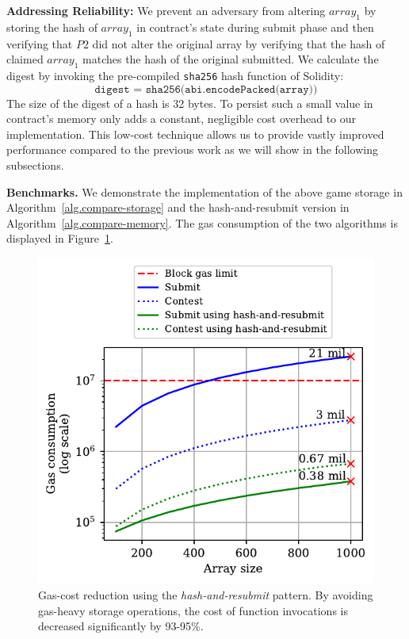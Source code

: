 \noindent

\textbf{Addressing Reliability:} We prevent an adversary from altering
$array_1$ by storing the hash of $array_1$ in contract's state during submit
phase and then verifying that $P2$ did not alter the original array by
verifying that the hash of claimed $array_1$ matches the hash of the original
submitted. We calculate the digest by invoking the pre-compiled \texttt{sha256}
hash function of Solidity:
\[\texttt{digest = sha256(abi.encodePacked(array))}\] The size of the digest of
a hash is 32 bytes. To persist such a small value in contract's memory only
adds a constant, negligible cost overhead to our implementation. This low-cost
technique allows us to provide vastly improved performance compared to the
previous work as we will show in the following subsections.

\noindent
\textbf{Benchmarks.} We demonstrate the implementation of the above game storage in
Algorithm~\ref{alg.compare-storage} and the hash-and-resubmit version in
Algorithm~\ref{alg.compare-memory}. The gas consumption of the two algorithms
is displayed in Figure~\ref{fig:har-example}.

\begin{figure}[h!]
\begin{center}
\includegraphics[width=1 \columnwidth]{figures/har-example.pdf}
\end{center}
\caption{Gas-cost reduction using the \emph{hash-and-resubmit} pattern. By
avoiding gas-heavy storage operations, the cost of function invocations is
decreased significantly by 93-95\%.}
\label{fig:har-example}
\end{figure}

